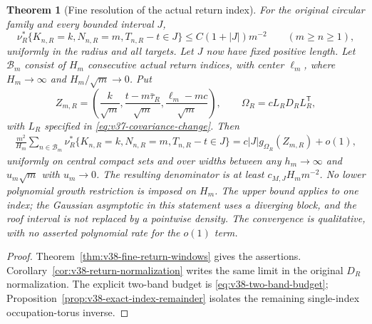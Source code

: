 \documentclass[11pt,reqno]{amsart}
\numberwithin{equation}{section}
\newtheorem{leadtheorem}{Theorem}
\theoremstyle{definition}\newtheorem{definition}[theorem]{Definition}
\theoremstyle{remark}\newtheorem{remark}[theorem]{Remark}
\begin{document}
\begin{leadtheorem}[Fine resolution of the actual return index]
\label{thm:intro-v38-fine-returns}
For the original circular family and every bounded interval $J$,
\[
 \nu_R^*\{K_{n,R}=k,N_{n,R}=m,T_{n,R}-t\in J\}
       \le C(1+|J|)m^{-2}\qquad(m\ge n\ge1),
\]
uniformly in the radius and all targets. Let $J$ now have fixed positive
length. Let $\mathcal B_m$ consist of $H_m$ consecutive actual return
indices, with center $\ell_m$, where $H_m\to\infty$ and
$H_m/\sqrt m\to0$. Put
\[
 Z_{m,R}=\left(\frac{k}{\sqrt m},
       \frac{t-m\bar\tau_R}{\sqrt m},
       \frac{\ell_m-mc}{\sqrt m}\right),\qquad
 \Omega_R=cL_RD_RL_R^{\mathsf T},
\]
with $L_R$ specified in \eqref{eq:v37-covariance-change}. Then
\begin{align}\label{eq:intro-v38-fine-returns}
 \frac{m^2}{H_m}\sum_{n\in\mathcal B_m}
 \nu_R^*\{K_{n,R}=k,N_{n,R}=m,T_{n,R}-t\in J\}
       =c|J|g_{\Omega_R}(Z_{m,R})+o(1),
\end{align}
uniformly on central compact sets and over widths between any
$h_m\to\infty$ and $u_m\sqrt m$ with $u_m\to0$.
The resulting denominator is at least $c_{M,J}H_mm^{-2}$.
No lower polynomial growth restriction is imposed on $H_m$.
The upper bound applies to one index; the Gaussian asymptotic in this
statement uses a diverging block, and the roof interval is not replaced by a pointwise
density. The convergence is qualitative, with no asserted polynomial
rate for the $o(1)$ term.
\end{leadtheorem}
\begin{proof}
Theorem~\ref{thm:v38-fine-return-windows} gives the assertions.
Corollary~\ref{cor:v38-return-normalization} writes the same limit in
the original $D_R$ normalization. The explicit two-band budget is
\eqref{eq:v38-two-band-budget};
Proposition~\ref{prop:v38-exact-index-remainder} isolates the remaining
single-index occupation-torus inverse.
\end{proof}
\end{document}
